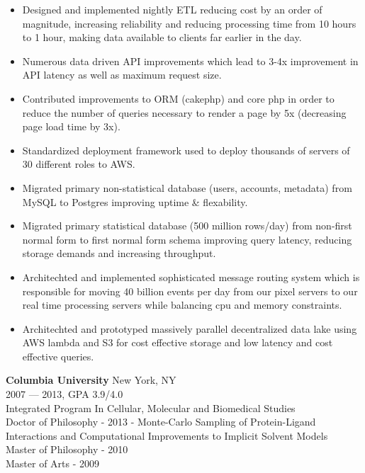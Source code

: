 \begin{itemize}[topsep=1ex, partopsep=0ex, parsep=0ex, itemsep=0.5ex]
    \item Designed and implemented nightly ETL reducing cost by an order of magnitude, increasing reliability and reducing processing time from {\mytilde}10 hours to {\mytilde}1 hour, making data available to clients far earlier in the day.
    \item Numerous data driven API improvements which lead to 3-4x improvement in API latency as well as maximum request size.
    \item Contributed improvements to ORM (cakephp) and core php in order to reduce the number of queries necessary to render a page by 5x (decreasing page load time by {\mytilde}3x).
    \item Standardized deployment framework used to deploy thousands of servers of {\mytilde}30 different roles to AWS.
    \item Migrated primary non-statistical database (users, accounts, metadata) from MySQL to Postgres improving uptime \& flexability.
    \item Migrated primary statistical database (500 million rows/day) from non-first normal form to first normal form schema improving query latency, reducing storage demands and increasing throughput.
    \item Architechted and implemented sophisticated message routing system which is responsible for moving {\mytilde}40 billion events per day from our pixel servers to our real time processing servers while balancing cpu and memory constraints.
    \item Architechted and prototyped massively parallel decentralized data lake using AWS lambda and S3 for cost effective storage and low latency and cost effective queries.
\end{itemize}

\vspace{\littleskip}


\myfontsize{\bigheader}
\textbf{Columbia University}
\myfontsize{\bodysize}
New York, NY\\
2007 --- 2013, GPA 3.9/4.0\\
Integrated Program In Cellular, Molecular and Biomedical Studies\\
Doctor of Philosophy - 2013 - Monte-Carlo Sampling of Protein-Ligand Interactions and Computational Improvements to Implicit Solvent Models\\
Master of Philosophy - 2010\\
Master of Arts - 2009\\


